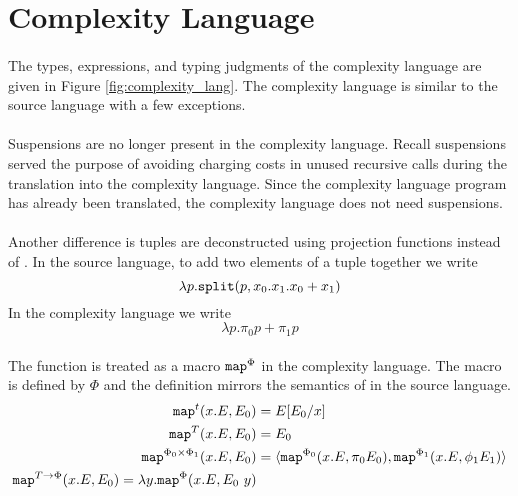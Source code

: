 \section{Complexity Language}

\paragraph{}
The types, expressions, and typing judgments of the complexity language are
given in Figure \ref{fig:complexity_lang}.  The complexity language is similar
to the source language with a few exceptions.

\paragraph{}
Suspensions are no longer present in the complexity language. Recall
suspensions served the purpose of avoiding charging costs in unused recursive
calls during the translation into the complexity language. Since the complexity
language program has already been translated, the complexity language does not
need suspensions.

\paragraph{}
Another difference is tuples are deconstructed using projection functions
instead of . In the source language, to add two elements of a tuple
together we write
%
\[
  \lambda p.\texttt{split}(p,x_0.x_1.x_0 + x_1)
\]
%
In the complexity language we write
%
\[
  \lambda p.\pi_0 p + \pi_1 p
\]
%

\paragraph{}
The  function is treated as a macro $\texttt{map}^\Phi$ in the complexity
language. The macro is defined by $\Phi$ and the definition mirrors the
semantics of  in the source language.
%
\begin{align*}
  \texttt{map}^t(x.E,E_0) &= E[E_0/x] \\
  \texttt{map}^T(x.E,E_0) &= E_0 \\
  \texttt{map}^{\Phi_0\times\Phi_1}(x.E,E_0) &= \langle\texttt{map}^{\Phi_0}(x.E,\pi_0 E_0), \texttt{map}^{\Phi_1}(x.E,\phi_1 E_1)\rangle \\
  \texttt{map}^{T \to \Phi}(x.E,E_0) = \lambda y.\texttt{map}^\Phi(x.E,E_0\ y)
\end{align*}
%


